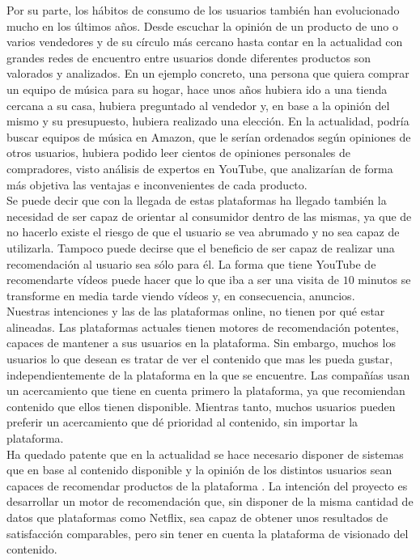 Por su parte, los hábitos de consumo de los usuarios también han evolucionado mucho en los últimos años. Desde escuchar la opinión de un producto de uno o varios vendedores y de su círculo más cercano hasta contar en la actualidad con grandes redes de encuentro entre usuarios donde diferentes productos son valorados y analizados. En un ejemplo concreto, una persona que quiera comprar un equipo de música para su hogar, hace unos años hubiera ido a una tienda cercana a su casa, hubiera preguntado al vendedor y, en base a la opinión del mismo y su presupuesto, hubiera realizado una elección. En la actualidad, podría buscar equipos de música en Amazon, que le serían ordenados según opiniones de otros usuarios, hubiera podido leer cientos de opiniones personales de compradores, visto análisis de expertos en YouTube, que analizarían de forma más objetiva las ventajas e inconvenientes de cada producto.\\

Se puede decir que con la llegada de estas plataformas ha llegado también la necesidad de ser capaz de orientar al consumidor dentro de las mismas, ya que de no hacerlo existe el riesgo de que el usuario se vea abrumado y no sea capaz de utilizarla. Tampoco puede decirse que el beneficio de ser capaz de realizar una recomendación al usuario sea sólo para él. La forma que tiene YouTube de recomendarte vídeos puede hacer que lo que iba a ser una visita de $10$ minutos se transforme en media tarde viendo vídeos y, en consecuencia, anuncios.\\

Nuestras intenciones y las de las plataformas online, no tienen por qué estar alineadas. Las plataformas actuales tienen motores de recomendación potentes, capaces de mantener a sus usuarios en la plataforma. Sin embargo, muchos los usuarios lo que desean es tratar de ver el contenido que mas les pueda gustar, independientemente de la plataforma en la que se encuentre. Las compañías usan un acercamiento que tiene en cuenta primero la plataforma, ya que recomiendan contenido que ellos tienen disponible. Mientras tanto, muchos usuarios pueden preferir un acercamiento que dé prioridad al contenido, sin importar la plataforma.\\

Ha quedado patente que en la actualidad se hace necesario disponer de sistemas que en base al contenido disponible y la opinión de los distintos usuarios sean capaces de recomendar productos de la plataforma \cite{Konstan2004}. La intención del proyecto es desarrollar un motor de recomendación que, sin disponer de la misma cantidad de datos que plataformas como Netflix, sea capaz de obtener unos resultados de satisfacción comparables, pero sin tener en cuenta la plataforma de visionado del contenido.


